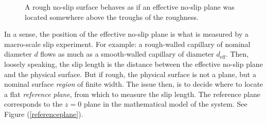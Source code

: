 \documentclass[12pt, a4paper, twoside, openright]{book}
\begin{document}
\begin{figure}[ht]
\centering
{}
\caption{A rough no-slip surface behaves as if an effective no-slip plane was located somewhere above the troughs of the roughness.}\label{effnoslipplane}
\end{figure}

In a sense, the position of the effective no-slip plane is what is measured by a macro-scale slip experiment. For example: a rough-walled capillary of nominal diameter $d$ flows as much as a smooth-walled capillary of diameter $d_{\mathrm{eff}}$.  Then, loosely speaking, the slip length is the distance between the effective no-slip plane and the physical surface.  But if rough, the physical surface is not a plane, but a nominal surface \emph{region} of finite width.  The issue then, is to decide where to locate a flat \emph{reference plane}, from which to measure the slip length.  The reference plane corresponds to the $z=0$ plane in the mathematical model of the system.  See Figure (\ref{referenceplane}).
\end{document}
